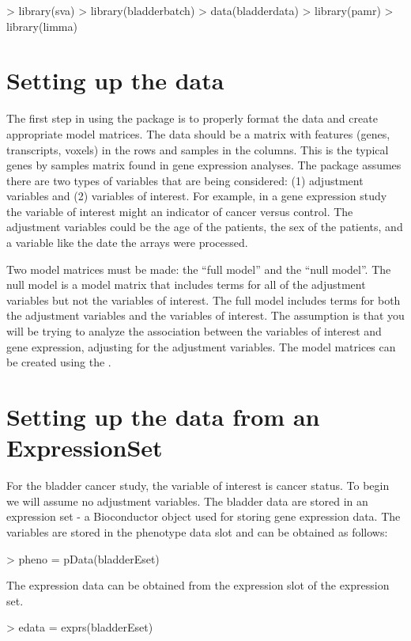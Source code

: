 \documentclass[12pt]{article}
\begin{document}
\begin{Schunk}
\begin{Sinput}
> library(sva)
> library(bladderbatch)
> data(bladderdata)
> library(pamr)
> library(limma)
\end{Sinput}
\end{Schunk}

\section{Setting up the data}

The first step in using the  package is to properly format the data and create appropriate model matrices. The data should be a matrix with features (genes, transcripts, voxels) in the rows and samples in the columns. This is the typical genes by samples matrix found in gene expression analyses. The  package assumes there are two types of variables that are being considered: (1) adjustment variables and (2) variables of interest. For example, in a gene expression study the variable of interest might an indicator of cancer versus control. The adjustment variables could be the age of the patients, the sex of the patients, and a variable like the date the arrays were processed. 

Two model matrices must be made: the ``full model'' and the ``null model''. The null model is a model matrix that includes terms for all of the adjustment variables but not the variables of interest. The full model includes terms for both the adjustment variables and the variables of interest. The assumption is that you will be trying to analyze the association between the variables of interest and gene expression, adjusting for the adjustment variables. The model matrices can be created using the . 


\section{Setting up the data from an ExpressionSet}

For the bladder cancer study, the variable of interest is cancer status.  To begin we will assume no adjustment variables. The bladder data are stored in an expression set - a Bioconductor object used for storing gene expression data. The variables are stored in the phenotype data slot and can be obtained as follows: 
\begin{Schunk}
\begin{Sinput}
> pheno = pData(bladderEset)
\end{Sinput}
\end{Schunk}
The expression data can be obtained from the expression slot of the expression set. 
\begin{Schunk}
\begin{Sinput}
> edata = exprs(bladderEset)
\end{Sinput}
\end{Schunk}
\end{document}
